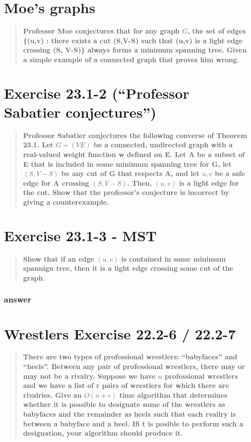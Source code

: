 \documentclass[titlepage]{article}\usepackage[]{graphicx}\usepackage[]{color}
\begin{document}
\section{Moe's graphs}
\begin{quote}
  \textbf{Professor Moe conjectures that for any graph $G$, the set of
edges \{(u,v) : there exists a cut (S,V-S) such that (u,v) is a light
edge crossing (S, V-S)\} always forms a minimum spanning tree.  Given
a simple example of a connected graph that proves him wrong.}
\end{quote}

\section{ Exercise 23.1-2 (``Professor Sabatier conjectures'')}
\begin{quote}
  \textbf{Professor Sabatier conjectures the following converse of Theorem
  23.1. Let $G = (V E)$  be a connected, undirected graph with a real-valued weight function w
defined on E. Let A be a subset of E that is included in some minimum spanning
tree for G, let $(S, V- S)$ be any cut of G that respects A, and let $u,v$ be a
safe edge for A crossing $(S, V-S)$. Then, $(u,v)$ is a light edge for the cut. Show
that the professor’s conjecture is incorrect by giving a counterexample.}
\end{quote}

\section{ Exercise 23.1-3 - MST} 
\begin{quote}
  \textbf{Show that if an edge $(u,v)$ is contained in some minimum spannign
  tree, then it is a light edge crossing some cut of the graph.}
\end{quote}
\subsubsection{answer}

\section{Wrestlers Exercise 22.2-6 / 22.2-7 } 
\begin{quote}
  \textbf{There are two types of professional wrestlers: ``babyfaces'' and
  ``heels''. Between any pair of professional wrestlers, there may or may not
be a rivalry. Suppose we have $n$ professional wrestlers and we have a list of
r pairs of wrestlers for which there are rivalries. Give an $O(n + r)$ time
algorithm that determines whether it is possible to designate some of the
wrestlers as babyfaces and the remainder as heels such that each rvailry is
between a babyface and a heel. Ifi t is posible to perform such a designation,
your algorithm should produce it.}
\end{quote}
\end{document}
